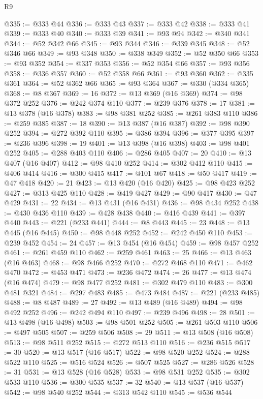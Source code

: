 \begin{lexlean}{R9}
\begin{coremodule}
@335 := @333 @44
@336 := @333 @43
@337 := @333 @42
@338 := @333 @41
@339 := @333 @40
@340 := @333 @39
@341 := @93 @94
@342 := @340 @341
@344 := @52 @342 @66
@345 := @93 @344
@346 := @339 @345
@348 := @52 @346 @66
@349 := @93 @348
@350 := @338 @349
@352 := @52 @350 @66
@353 := @93 @352
@354 := @337 @353
@356 := @52 @354 @66
@357 := @93 @356
@358 := @336 @357
@360 := @52 @358 @66
@361 := @93 @360
@362 := @335 @361
@364 := @52 @362 @66
@365 := @93 @364
@367 := @330 (@334 @365)
@368 := @8 @367
@369 := 16
@372 := @13 @369 (@16 @369)
@374 := @98 @372 @252
@376 := @242 @374 @110
@377 := @239 @376
@378 := 17
@381 := @13 @378 (@16 @378)
@383 := @98 @381 @252
@385 := @261 @383 @110
@386 := @259 @385
@387 := 18
@390 := @13 @387 (@16 @387)
@392 := @98 @390 @252
@394 := @272 @392 @110
@395 := @386 @394
@396 := @377 @395
@397 := @236 @396
@398 := 19
@401 := @13 @398 (@16 @398)
@403 := @98 @401 @252
@405 := @288 @403 @110
@406 := @286 @405
@407 := 20
@410 := @13 @407 (@16 @407)
@412 := @98 @410 @252
@414 := @302 @412 @110
@415 := @406 @414
@416 := @300 @415
@417 := @101 @67
@418 := @50 @417
@419 := @47 @418
@420 := 21
@423 := @13 @420 (@16 @420)
@425 := @98 @423 @252
@427 := @313 @425 @110
@428 := @419 @427
@429 := @90 @417
@430 := @47 @429
@431 := 22
@434 := @13 @431 (@16 @431)
@436 := @98 @434 @252
@438 := @430 @436 @110
@439 := @428 @438
@440 := @416 @439
@441 := @397 @440
@443 := @221 (@233 @441)
@444 := @8 @443
@445 := 23
@448 := @13 @445 (@16 @445)
@450 := @98 @448 @252
@452 := @242 @450 @110
@453 := @239 @452
@454 := 24
@457 := @13 @454 (@16 @454)
@459 := @98 @457 @252
@461 := @261 @459 @110
@462 := @259 @461
@463 := 25
@466 := @13 @463 (@16 @463)
@468 := @98 @466 @252
@470 := @272 @468 @110
@471 := @462 @470
@472 := @453 @471
@473 := @236 @472
@474 := 26
@477 := @13 @474 (@16 @474)
@479 := @98 @477 @252
@481 := @302 @479 @110
@483 := @300 @481 @321
@484 := @297 @483
@485 := @473 @484
@487 := @221 (@233 @485)
@488 := @8 @487
@489 := 27
@492 := @13 @489 (@16 @489)
@494 := @98 @492 @252
@496 := @242 @494 @110
@497 := @239 @496
@498 := 28
@501 := @13 @498 (@16 @498)
@503 := @98 @501 @252
@505 := @261 @503 @110
@506 := @497 @505
@507 := @259 @506
@508 := 29
@511 := @13 @508 (@16 @508)
@513 := @98 @511 @252
@515 := @272 @513 @110
@516 := @236 @515
@517 := 30
@520 := @13 @517 (@16 @517)
@522 := @98 @520 @252
@524 := @288 @522 @110
@525 := @516 @524
@526 := @507 @525
@527 := @286 @526
@528 := 31
@531 := @13 @528 (@16 @528)
@533 := @98 @531 @252
@535 := @302 @533 @110
@536 := @300 @535
@537 := 32
@540 := @13 @537 (@16 @537)
@542 := @98 @540 @252
@544 := @313 @542 @110
@545 := @536 @544

\end{coremodule}
\end{lexlean}
